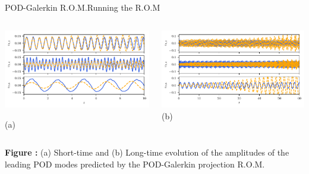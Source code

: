 \documentclass[usenames,dvipsnames,svgnames,10pt,aspectratio=169]{beamer}
\begin{document}
\begin{frame}[t, c]{POD-Galerkin R.O.M.}{Running the R.O.M}
	\begin{columns}
		\begin{column}{.5\textwidth}
			\centering
			\includegraphics[width=.9\textwidth]{galerkin_projection_chronos}

			(a)
		\end{column}
		\begin{column}{.5\textwidth}
			\centering
			\includegraphics[width=.9\textwidth]{galerkin_projection_chronos_bis} \\

			(b)
		\end{column}

	\end{columns}

	\bigskip

	\textbf{Figure :} (a) Short-time and (b) Long-time evolution of the amplitudes of the leading POD modes predicted by the POD-Galerkin projection R.O.M.

	\vspace{0.5cm}
\end{frame}
\end{document}
